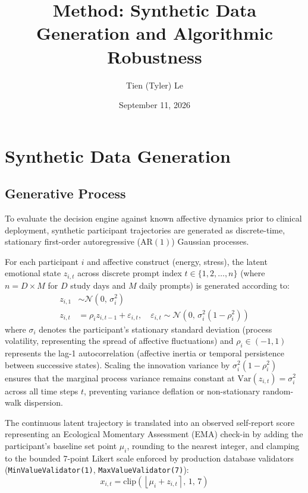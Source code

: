 \documentclass[11pt,letterpaper]{article}
\title{\textbf{Method: Synthetic Data Generation and Algorithmic Robustness}}
\author{Tien (Tyler) Le}
\date{September 11, 2026}
\begin{document}
\maketitle

\section{Synthetic Data Generation}

\subsection{Generative Process}

To evaluate the decision engine against known affective dynamics prior to clinical deployment, synthetic participant trajectories are generated as discrete-time, stationary first-order autoregressive ($\text{AR}(1)$) Gaussian processes. 

For each participant $i$ and affective construct (energy, stress), the latent emotional state $z_{i,t}$ across discrete prompt index $t \in \{1, 2, \dots, n\}$ (where $n = D \times M$ for $D$ study days and $M$ daily prompts) is generated according to:
\begin{align}
z_{i,1} &\sim \mathcal{N}(0,\, \sigma_i^2) \\
z_{i,t} &= \rho_i z_{i,t-1} + \varepsilon_{i,t}, \quad \varepsilon_{i,t} \sim \mathcal{N}\left(0,\, \sigma_i^2 (1 - \rho_i^2)\right)
\end{align}
where $\sigma_i$ denotes the participant's stationary standard deviation (process volatility, representing the spread of affective fluctuations) and $\rho_i \in (-1, 1)$ represents the lag-1 autocorrelation (affective inertia or temporal persistence between successive states). Scaling the innovation variance by $\sigma_i^2(1 - \rho_i^2)$ ensures that the marginal process variance remains constant at $\text{Var}(z_{i,t}) = \sigma_i^2$ across all time steps $t$, preventing variance deflation or non-stationary random-walk dispersion. 

The continuous latent trajectory is translated into an observed self-report score representing an Ecological Momentary Assessment (EMA) check-in by adding the participant's baseline set point $\mu_i$, rounding to the nearest integer, and clamping to the bounded 7-point Likert scale enforced by production database validators (\texttt{MinValueValidator(1)}, \texttt{MaxValueValidator(7)}):
\begin{equation}
x_{i,t} = \text{clip}\left(\left\lfloor \mu_i + z_{i,t} \right\rceil,\, 1,\, 7\right)
\end{equation}
\end{document}
